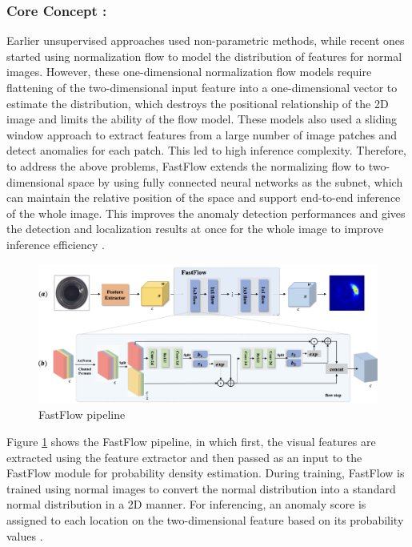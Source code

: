 \subsubsection*{Core Concept :}

Earlier unsupervised approaches used non-parametric methods, while recent ones started using normalization flow to model the distribution of features for normal images. However, these one-dimensional normalization flow models require flattening of the two-dimensional input feature into a one-dimensional vector to estimate the distribution, which destroys the positional relationship of the 2D image and limits the ability of the flow model. These models also used a sliding window approach to extract features from a large number of image patches and detect anomalies for each patch. This led to high inference complexity. Therefore, to address the above problems, FastFlow extends the normalizing flow to two-dimensional space by using fully connected neural networks as the subnet, which can maintain the relative position of the space and support end-to-end inference of the whole image. This improves the anomaly detection performances and gives the detection and localization results at once for the whole image to improve inference efficiency \cite{yu2021fastflowunsupervisedanomalydetection}.

\begin{figure}[ht!]
    \centering
    \includegraphics[width=1.1\linewidth]{Rohit_Master_Thesis//Images/fastflow_pipeline.png}
    \caption{FastFlow pipeline\cite{yu2021fastflowunsupervisedanomalydetection}}
    \label{fig:fastflow pipeline}
\end{figure}

Figure \ref{fig:fastflow pipeline} shows the FastFlow pipeline, in which first, the visual features are extracted using the feature extractor and then passed as an input to the FastFlow module for probability density estimation. During training, FastFlow is trained using normal images to convert the normal distribution into a standard normal distribution in a 2D manner. For inferencing, an anomaly score is assigned to each location on the two-dimensional feature based on its probability values \cite{yu2021fastflowunsupervisedanomalydetection}.


